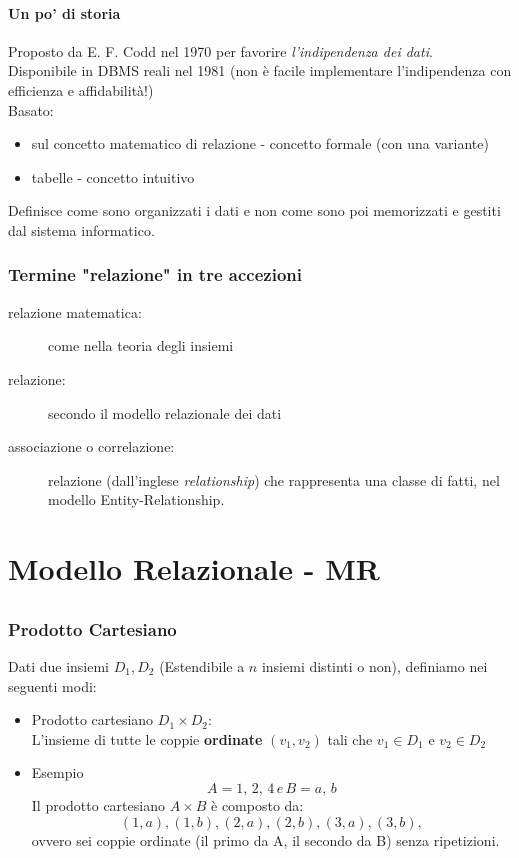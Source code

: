 \subsubsection{Un po' di storia}
Proposto da E. F. Codd nel 1970 per favorire \textit{l'indipendenza dei dati}.
\\Disponibile in DBMS reali nel 1981 (non è facile implementare l'indipendenza con efficienza e affidabilità!)
\\Basato:
\begin{itemize}
    \item sul concetto matematico di relazione - concetto formale (con una variante)
    \item tabelle - concetto intuitivo
\end{itemize}
Definisce come sono organizzati i dati e non come sono poi memorizzati e gestiti dal sistema informatico.

\subsection{Termine "relazione" in tre accezioni}
\begin{description}
    \item[relazione matematica:] come nella teoria degli insiemi
    \item[relazione:] secondo il modello relazionale dei dati
    \item[associazione o correlazione:] relazione (dall'inglese \textit{relationship}) che rappresenta una classe di fatti, nel modello Entity-Relationship.   
\end{description}

\chapter{Modello Relazionale - MR}
\section{}
\subsection{Prodotto Cartesiano}
Dati due insiemi $D_1, D_2$ (Estendibile a $n$ insiemi distinti o non), definiamo nei seguenti modi:
\begin{itemize}
    \item Prodotto cartesiano $D_1 \times D_2$:
    \\L'insieme di tutte le coppie \textbf{ordinate} $(v_1, v_2)$ tali che $v_1 \in D_1$ e $v_2 \in D_2$
    \item Esempio $$A = {1,\, 2,\, 4}\, e\, B = {a,\, b}$$ Il prodotto cartesiano $A \times B$ è composto da: $${(1,a), (1,b), (2,a), (2,b), (3,a), (3,b)},$$ ovvero sei coppie ordinate (il primo da A, il secondo da B) senza ripetizioni.
\end{itemize}

